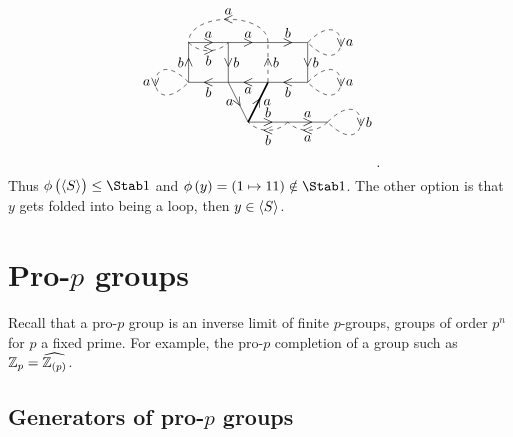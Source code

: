 \begin{example}
$$\begin{tikzpicture}
\draw (0, 0) to node{$ < $} node[below]{$ a $} (-1, 0);
\draw (-1, 0) to node{\rotatebox{30}{$ \vee $}} node[left]{$ a $} (-0.5, -1);
\draw [very thick] (-0.5, -1) to node{\rotatebox{60}{$ > $}} node[right]{$ a $} (0, 0);
\draw (-1, 0) to node{$ < $} node[below]{$ b $} (-2, 0);
\draw (-2, 0) to node{$ \wedge $} node[left]{$ b $} (-2, 1);
\draw (-2, 1) to node{$ > $} node[above]{$ a $} (-1, 1);
\draw (-1, 1) to node{$ \vee $} node[right]{$ b $} (-1, 0);
\draw (-1, 1) to node{$ > $} node[above]{$ a $} (0, 1);
\draw (0, 1) to node{$ > $} node[above]{$ b $} (1, 1);
\draw (1, 1) to node{$ \vee $} node[right]{$ b $} (1, 0);
\draw (1, 0) to node{$ < $} node[below]{$ b $} (0, 0);
\draw (-0.5, -1) to node{$ > $} node[above]{$ b $} (0.5, -1);
\draw (0.5, -1) to node{$ > $} node[above]{$ a $} (1.5, -1);
\draw [dashed] (0, 0) to node{$ \wedge $} node[right]{$ b $} (0, 1);
\draw [dashed] (-2, 1) to [in=-135, out=-45] node{$ > $} node[below]{$ b $} (-1, 1);
\draw [dashed] (0, 1) to [in=90, out=90] node{$ < $} node[above]{$ a $} (-2, 1);
\draw [dashed] (1, 1) to [in=-45, out=45, distance=45] node{$ \vee $} node[right]{$ a $} (1, 1);
\draw [dashed] (-2, 0) to [in=-135, out=135, distance=45] node{$ \vee $} node[left]{$ a $} (-2, 0);
\draw [dashed] (1, 0) to [in=-45, out=45, distance=45] node{$ \vee $} node[right]{$ a $} (1, 0);
\draw [dashed] (0.5, -1) to [in=-45, out=-135] node{$ < $} node[below]{$ b $} (-0.5, -1);
\draw [dashed] (1.5, -1) to [in=-45, out=-135] node{$ < $} node[below]{$ a $} (0.5, -1);
\draw [dashed] (1.5, -1) to [in=-45, out=45, distance=45] node{$ \vee $} node[right]{$ b $} (1.5, -1);
\end{tikzpicture}.
$$
Thus $ \phi\br{\abr{S}} \le \Stab 1 $ and $ \phi\br{y} = \br{1 \mapsto 11} \notin \Stab 1 $. The other option is that $ y $ gets folded into being a loop, then $ y \in \left\langle S \right\rangle $.
\end{example}

\pagebreak

\section{Pro-\texorpdfstring{$ p $}{p} groups}

Recall that a pro-$ p $ group is an inverse limit of finite $ p $-groups, groups of order $ p^n $ for $ p $ a fixed prime. For example, the pro-$ p $ completion of a group such as $ \ZZ_p = \widehat{\ZZ_{\br{p}}} $.

\subsection{Generators of pro-\texorpdfstring{$ p $}{p} groups}

